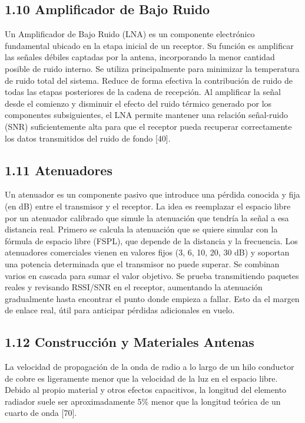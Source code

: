 \documentclass[12pt,a4paper]{article}
\begin{document}
\subsection{1.10 Amplificador de Bajo Ruido}\label{amplificador-de-bajo-ruido}

Un Amplificador de Bajo Ruido (LNA) es un componente electrónico fundamental ubicado en la etapa inicial de un receptor. Su función es amplificar las señales débiles captadas por la antena, incorporando la menor cantidad posible de ruido interno. Se utiliza principalmente para minimizar la temperatura de ruido total del sistema. Reduce de forma efectiva la contribución de ruido de todas las etapas posteriores de la cadena de recepción. Al amplificar la señal desde el comienzo y disminuir el efecto del ruido térmico generado por los componentes subsiguientes, el LNA permite mantener una relación señal-ruido (SNR) suficientemente alta para que el receptor pueda recuperar correctamente los datos transmitidos del ruido de fondo {[}40{]}.

\subsection{1.11 Atenuadores}\label{atenuadores}

Un atenuador es un componente pasivo que introduce una pérdida conocida y fija (en dB) entre el transmisor y el receptor. La idea es reemplazar el espacio libre por un atenuador calibrado que simule la atenuación que tendría la señal a esa distancia real. Primero se calcula la atenuación que se quiere simular con la fórmula de espacio libre (FSPL), que depende de la distancia y la frecuencia. Los atenuadores comerciales vienen en valores fijos (3, 6, 10, 20, 30 dB) y soportan una potencia determinada que el transmisor no puede superar. Se combinan varios en cascada para sumar el valor objetivo. Se prueba transmitiendo paquetes reales y revisando RSSI/SNR en el receptor, aumentando la atenuación gradualmente hasta encontrar el punto donde empieza a fallar. Esto da el margen de enlace real, útil para anticipar pérdidas adicionales en vuelo.

\subsection{1.12 Construcción y Materiales Antenas}\label{construcciuxf3n-y-materiales-antenas}

La velocidad de propagación de la onda de radio a lo largo de un hilo conductor de cobre es ligeramente menor que la velocidad de la luz en el espacio libre. Debido al propio material y otros efectos capacitivos, la longitud del elemento radiador suele ser aproximadamente 5\% menor que la longitud teórica de un cuarto de onda {[}70{]}.
\end{document}
